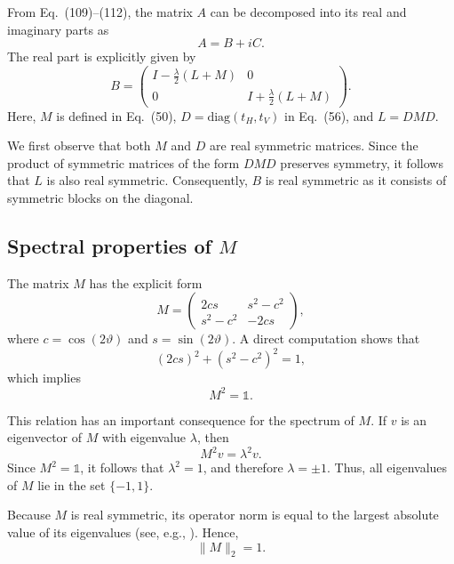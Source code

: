 \documentclass[%
 reprint,
 amsmath,amssymb,
 aps,
twocolumn
]{revtex4-2}
\begin{document}
From Eq.~(109)–(112), the matrix $A$ can be decomposed into its real and imaginary parts as
\begin{equation}
A = B + iC.
\end{equation}
The real part is explicitly given by
\begin{equation}
B =
\begin{pmatrix}
I - \frac{\lambda}{2}(L + M) & 0 \\
0 & I + \frac{\lambda}{2}(L + M)
\end{pmatrix}.
\end{equation}
Here, $M$ is defined in Eq.~(50), $D = \mathrm{diag}(t_H, t_V)$ in Eq.~(56), and $L = DMD$.

We first observe that both $M$ and $D$ are real symmetric matrices. Since the product of symmetric matrices of the form $DMD$ preserves symmetry, it follows that $L$ is also real symmetric. Consequently, $B$ is real symmetric as it consists of symmetric blocks on the diagonal.

\subsection{Spectral properties of $M$}

The matrix $M$ has the explicit form
\begin{equation}
M =
\begin{pmatrix}
2cs & s^2 - c^2 \\
s^2 - c^2 & -2cs
\end{pmatrix},
\end{equation}
where $c = \cos(2\vartheta)$ and $s = \sin(2\vartheta)$. A direct computation shows that
\begin{equation}
(2cs)^2 + (s^2 - c^2)^2 = 1,
\end{equation}
which implies
\begin{equation}
M^2 = \mathbb{1}.
\end{equation}

This relation has an important consequence for the spectrum of $M$. If $v$ is an eigenvector of $M$ with eigenvalue $\lambda$, then
\begin{equation}
M^2 v = \lambda^2 v.
\end{equation}
Since $M^2 = \mathbb{1}$, it follows that $\lambda^2 = 1$, and therefore $\lambda = \pm 1$. Thus, all eigenvalues of $M$ lie in the set $\{-1,1\}$.

Because $M$ is real symmetric, its operator norm is equal to the largest absolute value of its eigenvalues (see, e.g., \cite{GilbertIntroductionToLinearAlgebra2016}). Hence,
\begin{equation}
\|M\|_2 = 1.
\end{equation}
\end{document}
